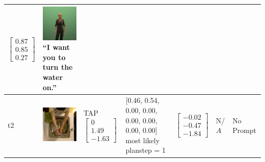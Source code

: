 \begin{longtable}{| V{0.8cm} | V{2.6cm} | V{1.6cm} | V{2.1cm} | V{1.55cm} | V{1.6cm} | V{3.2cm} |}
$\begin{bmatrix}
0.87 \\
0.85 \\
0.27
\end{bmatrix}$ &
\includegraphics[width=2.6cm]{fig/prompt/_i-want-you-to-turn-the-water-on_.jpg}
\linebreak
\footnotesize
``I want you to turn the water on.''
\\ \hline


t2 &
\includegraphics[width=\linewidth]{fig/system/_slow2-tap1_.jpg} &
TAP
\linebreak\linebreak
$\begin{bmatrix}
0 \\
1.49 \\
-1.63
\end{bmatrix}$ &
[0.46, 0.54, 0.00, 0.00, 0.00, 0.00, 0.00, 0.00] most likely planstep = 1 &
$\begin{bmatrix}
-0.02 \\
-0.47 \\
-1.84
\end{bmatrix}$ &
N/$A$ &
No Prompt
\\ \hline



\end{longtable}

